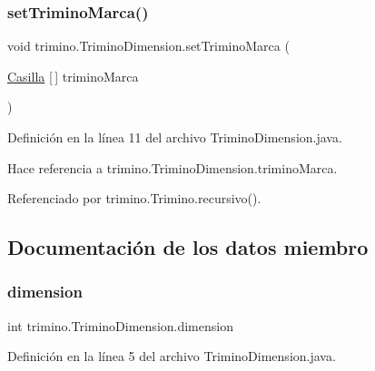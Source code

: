 \subsubsection{\texorpdfstring{setTriminoMarca()}{setTriminoMarca()}}
{\footnotesize\ttfamily void trimino.\+Trimino\+Dimension.\+set\+Trimino\+Marca (\begin{DoxyParamCaption}\item[{\mbox{\hyperlink{classtrimino_1_1Casilla}{Casilla}} \mbox{[}$\,$\mbox{]}}]{trimino\+Marca }\end{DoxyParamCaption})}



Definición en la línea 11 del archivo Trimino\+Dimension.\+java.


\begin{DoxyCode}{0}

\end{DoxyCode}


Hace referencia a trimino.\+Trimino\+Dimension.\+trimino\+Marca.



Referenciado por trimino.\+Trimino.\+recursivo().



\subsection{Documentación de los datos miembro}
\mbox{\label{classtrimino_1_1TriminoDimension_ae065548cf49a3a7bfb4eb9ab1f6386b1}} 
\subsubsection{\texorpdfstring{dimension}{dimension}}
{\footnotesize\ttfamily int trimino.\+Trimino\+Dimension.\+dimension\hspace{0.3cm}{\ttfamily [package]}}



Definición en la línea 5 del archivo Trimino\+Dimension.\+java.



